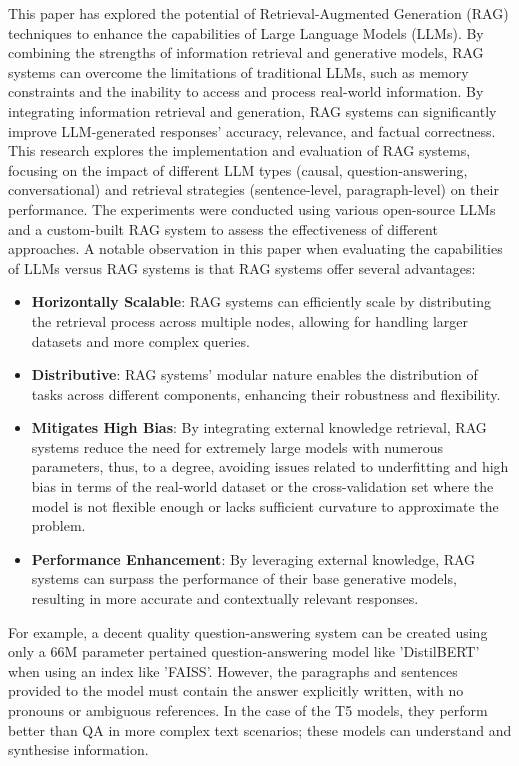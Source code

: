 \documentclass{wseas}
\begin{document}
This paper has explored the potential of Retrieval-Augmented Generation 
(RAG) techniques to enhance the capabilities of Large Language Models (LLMs).
By combining the strengths of information retrieval and generative models, 
RAG systems can overcome the limitations of traditional LLMs, such as memory
constraints and the inability to access and process real-world information. 
By integrating information retrieval and generation, RAG systems can significantly 
improve LLM-generated responses' accuracy, relevance, and factual correctness.  
This research explores the implementation and evaluation of RAG systems, focusing on 
the impact of different LLM types (causal, question-answering, conversational) and retrieval 
strategies (sentence-level, paragraph-level) on their performance. 
The experiments were conducted using various open-source LLMs and a custom-built RAG system to 
assess the effectiveness of different approaches. A notable observation in this paper when evaluating the capabilities of LLMs versus RAG systems is that RAG systems offer several advantages:
\begin{itemize}
  \item
    \textbf{Horizontally Scalable}: RAG systems can efficiently scale by distributing the retrieval process across multiple nodes, 
    allowing for handling larger datasets and more complex queries.
  \item
    \textbf{Distributive}: RAG systems' modular nature enables the distribution of tasks across different components, 
    enhancing their robustness and flexibility.
  \item
    \textbf{Mitigates High Bias}: By integrating external knowledge retrieval, RAG systems reduce 
    the need for extremely large models with numerous parameters, thus, to a degree, avoiding issues 
    related to underfitting and high bias in terms of the real-world dataset or the cross-validation 
    set where the model is not flexible enough or lacks sufficient curvature to approximate the problem.
  \item
    \textbf{Performance Enhancement}: By leveraging external knowledge, RAG systems can surpass the
    performance of their base generative models, resulting in more accurate and contextually relevant responses.
\end{itemize}

For example, a decent quality question-answering system can be created 
using only a 66M parameter pertained question-answering model like 'DistilBERT' when using an index like 'FAISS'. 
However, the paragraphs and sentences provided to the model must contain the answer explicitly written, with
no pronouns or ambiguous references. In the case of the T5 models, they perform better than QA in more complex 
text scenarios; these models can understand and synthesise information.
\end{document}
